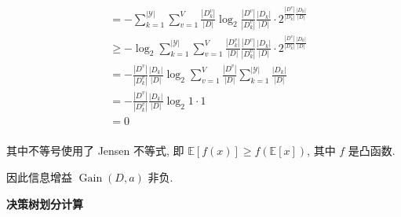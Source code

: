 \documentclass[answers]{exam}  %
\begin{document}
\begin{questions}
\begin{solution}
\begin{enumerate}
$$\begin{aligned}
                 & = -\sum_{k=1}^{|\mathcal{Y}|}\sum_{v=1}^{V}\frac{|D_k^{v}|}{|D|}\log_2 \frac{|D^{v}|}{|D_k^{v}|}\frac{|D_{k}|}{|D|}\cdot 2^{\frac{|D^{v}|}{|D_k^{v}|}\frac{|D_{k}|}{|D|}}                                                                             \\
                 & \ge -\log_2\sum_{k=1}^{|\mathcal{Y}|}\sum_{v=1}^{V}\frac{|D_k^{v}|}{|D|}\frac{|D^{v}|}{|D_k^{v}|}\frac{|D_{k}|}{|D|}\cdot 2^{\frac{|D^{v}|}{|D_k^{v}|}\frac{|D_{k}|}{|D|}}                                                                            \\
                 & = -\frac{|D^{v}|}{|D_k^{v}|}\frac{|D_{k}|}{|D|}\log_2\sum_{v=1}^{V}\frac{|D^{v}|}{|D|}\sum_{k=1}^{|\mathcal{Y}|}\frac{|D_{k}|}{|D|}                                                                                                                   \\
                 & = -\frac{|D^{v}|}{|D_k^{v}|}\frac{|D_{k}|}{|D|}\log_2 1 \cdot 1                                                                                                                                                                                       \\
                 & = 0                                                                                                                                                                                                                                                   \\
              \end{aligned}
            $$

            其中不等号使用了 Jensen 不等式, 即 $\mathbb{E}[f(x)] \ge f(\mathbb{E}[x])$, 其中 $f$ 是凸函数.

            因此信息增益 $\operatorname{Gain}(D, a)$ 非负.
    \end{enumerate}
  \end{solution}


  \question [15] \textbf{决策树划分计算} \label{ch4_prob:get_tree}


\end{questions}
\end{document}
